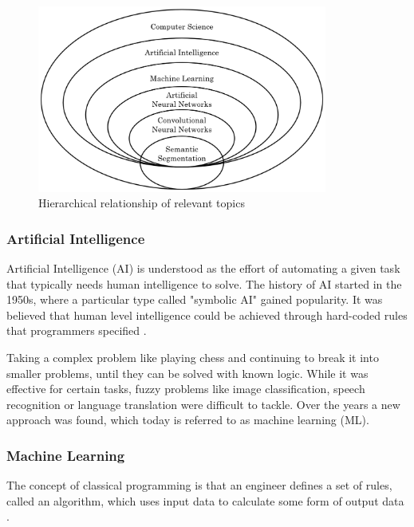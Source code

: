 \begin{figure}[H]
\centering
\par
\includegraphics[width=0.85\textwidth]{imgs/cs_hier.png}
\caption{Hierarchical relationship of relevant topics}
\par
\end{figure}

\subsubsection{Artificial Intelligence}

Artificial Intelligence (AI) is understood as the effort of automating a given task that typically needs human intelligence to solve. The history of AI started in the 1950s, where a particular type called "symbolic AI" gained popularity. It was believed that human level intelligence could be achieved through hard-coded rules that programmers specified \cite{Chollet2017}. 

Taking a complex problem like playing chess and continuing to break it into smaller problems, until they can be solved with known logic. While it was effective for certain tasks, fuzzy problems like image classification, speech recognition or language translation were difficult to tackle. Over the years a new approach was found, which today is referred to as machine learning (ML).

\subsubsection{Machine Learning}

The concept of classical programming is that an engineer defines a set of rules, called an algorithm, which uses input data to calculate some form of output data \cite{Chollet2017}.

